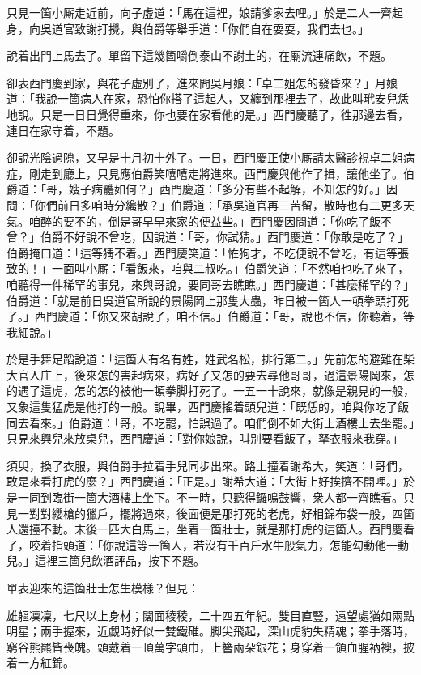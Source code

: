 只見一箇小厮走近前，向子虛道：「馬在這裡，娘請爹家去哩。」於是二人一齊起身，向吳道官致謝打攪，與伯爵等舉手道：「你們自在耍耍，我們去也。」

說着出門上馬去了。單留下這幾箇嚼倒泰山不謝土的，在廟流連痛飲，不題。

卻表西門慶到家，與花子虛別了，進來問吳月娘：「卓二姐怎的發昏來？」月娘道：「我說一箇病人在家，恐怕你搭了這起人，又纏到那裡去了，故此叫玳安兒恁地說。只是一日日覺得重來，你也要在家看他的是。」西門慶聽了，徃那邊去看，連日在家守着，不題。

卻說光陰過隙，又早是十月初十外了。一日，西門慶正使小厮請太醫診視卓二姐病症，剛走到廳上，只見應伯爵笑嘻嘻走將進來。西門慶與他作了揖，讓他坐了。伯爵道：「哥，嫂子病體如何？」西門慶道：「多分有些不起解，不知怎的好。」因問：「你們前日多咱時分纔散？」伯爵道：「承吳道官再三苦留，散時也有二更多天氣。咱醉的要不的，倒是哥早早來家的便益些。」西門慶因問道：「你吃了飯不曾？」伯爵不好說不曾吃，因說道：「哥，你試猜。」西門慶道：「你敢是吃了？」伯爵掩口道：「這等猜不着。」{}西門慶笑道：「恠狗才，不吃便說不曾吃，有這等張致的！」一面叫小厮：「看飯來，咱與二叔吃。」伯爵笑道：「不然咱也吃了來了，咱聽得一件稀罕的事兒，來與哥說，要同哥去瞧瞧。」西門慶道：「甚麼稀罕的？」伯爵道：「就是前日吳道官所說的景陽岡上那隻大蟲，昨日被一箇人一頓拳頭打死了。」西門慶道：「你又來胡說了，咱不信。」伯爵道：「哥，說也不信，你聽着，等我細說。」

於是手舞足蹈說道：「這箇人有名有姓，姓武名松，排行第二。」先前怎的避難在柴大官人庄上，後來怎的害起病來，病好了又怎的要去尋他哥哥，過這景陽岡來，怎的遇了這虎，怎的怎的被他一頓拳脚打死了。一五一十說來，就像是親見的一般，又象這隻猛虎是他打的一般。說畢，西門慶搖着頭兒道：「既恁的，咱與你吃了飯同去看來。」伯爵道：「哥，不吃罷，怕誤過了。咱們倒不如大街上酒樓上去坐罷。」只見來興兒來放桌兒，西門慶道：「對你娘說，叫別要看飯了，拏衣服來我穿。」

須臾，換了衣服，與伯爵手拉着手兒同步出來。路上撞着謝希大，笑道：「哥們，敢是來看打虎的麼？」西門慶道：「正是。」謝希大道：「大街上好挨擠不開哩。」於是一同到臨街一箇大酒樓上坐下。不一時，只聽得鑼鳴鼓響，衆人都一齊瞧看。只見一對對纓槍的獵戶，擺將過來，後面便是那打死的老虎，好相錦布袋一般，四箇人還擡不動。末後一匹大白馬上，坐着一箇壯士，就是那打虎的這箇人。西門慶看了，咬着指頭道：「你說這等一箇人，若沒有千百斤水牛般氣力，怎能勾動他一動兒。」{}這裡三箇兒飲酒評品，按下不題。

單表迎來的這箇壯士怎生模樣？但見：

\begin{myquote}
雄軀凜凜，七尺以上身材；闊面稜稜，二十四五年紀。雙目直豎，遠望處猶如兩點明星；兩手握來，近覷時好似一雙鐵碓。脚尖飛起，深山虎豹失精魂；拳手落時，窮谷熊羆皆䘮魄。頭戴着一頂萬字頭巾，上簪兩朵銀花；身穿着一領血腥衲襖，披着一方紅錦。
\end{myquote}

